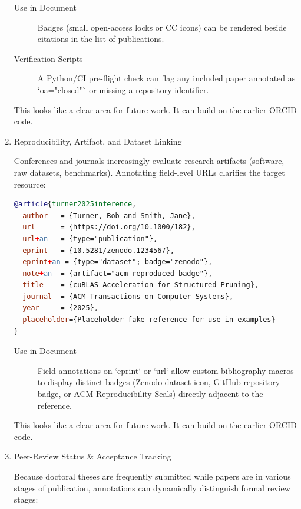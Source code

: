 \documentclass[12pt, twoside]{article}
\begin{document}
\begin{enumerate}
\begin{description}
    \item[Use in Document] Badges (\eg small open-access locks or CC icons) can be rendered beside citations in the list of publications.
    \item[Verification Scripts] A Python/\gls{CI} pre-flight check can flag any included paper annotated as `oa="closed"` or missing a repository identifier.
\end{description}

This looks like a clear area for future work. It can build on the earlier \gls{ORCID} code.
    \item Reproducibility, Artifact, and Dataset Linking

Conferences and journals increasingly evaluate research artifacts (software, raw datasets, benchmarks). Annotating field-level URLs clarifies the target resource:
\begin{lstlisting}[language={BibTeX}, breaklines=true, basicstyle=\small\ttfamily,  escapechar=|, caption={{Storing Reproducibility, Artifact, and Dataset Linking}}, label=lst:biberRepoducabilityMetadata]
@article{turner2025inference,
  author   = {Turner, Bob and Smith, Jane},
  url      = {https://doi.org/10.1000/182},
  url+an   = {type="publication"},
  eprint   = {10.5281/zenodo.1234567},
  eprint+an = {type="dataset"; badge="zenodo"},
  note+an  = {artifact="acm-reproduced-badge"},
  title    = {cuBLAS Acceleration for Structured Pruning},
  journal  = {ACM Transactions on Computer Systems},
  year     = {2025},
  placeholder={Placeholder fake reference for use in examples}
}
\end{lstlisting}
\begin{description}
    \item[Use in Document] Field annotations on `eprint` or `url` allow custom bibliography macros to display distinct badges (\eg Zenodo dataset icon, GitHub repository badge, or ACM Reproducibility Seals) directly adjacent to the reference.
\end{description}

This looks like a clear area for future work. It can build on the earlier \gls{ORCID} code.
    \item Peer-Review Status \& Acceptance Tracking

Because doctoral theses are frequently submitted while papers are in various stages of publication, annotations can dynamically distinguish formal review stages:


\end{enumerate}
\end{document}
